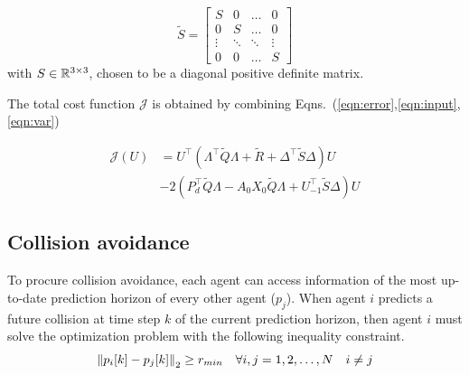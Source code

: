 \begin{equation}
\tilde{S} = \begin{bmatrix}
S & 0& \ldots & 0 \\
0 & S & \ldots & 0 \\
\vdots & \ddots & \ddots & \vdots \\
0 & 0 & \ldots & S
\end{bmatrix}
\end{equation}
with $S \in {\mathbb R}^{3 \times 3}$, chosen to be a diagonal positive definite matrix.

The total cost function $\mathcal{J}$ is obtained by combining Eqns.~(\ref{eqn:error},\ref{eqn:input},\ref{eqn:var})

\begin{equation}
\begin{aligned}
\mathcal{J}(U) &=  U^\top (\Lambda^{\top} \tilde{Q} \Lambda + \tilde{R} + \Delta^\top \tilde{S} \Delta) U \\
 & -2 (P_d^\top \tilde{Q} \Lambda -  A_0X_0 \tilde{Q} \Lambda + U_{-1}^\top \tilde{S} \Delta)U
\end{aligned}
\end{equation}	

\subsection{Collision avoidance}
To procure collision avoidance, each agent can access information of the most up-to-date prediction horizon of every other agent ($p_j$). When agent $i$ predicts a future collision at time step $k$ of the current prediction horizon, then agent $i$ must solve the optimization problem with the following inequality constraint.
\begin{equation}
\label{eqn:coll}
\left\Vert p_i[k]-p_j[k]\right\Vert_2 \geq r_{min} \quad \forall i,j = 1,2,\ldots,N \quad i \neq j
\end{equation}	


